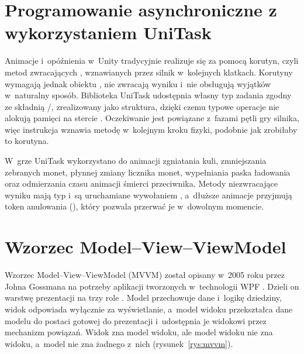 \section{Programowanie asynchroniczne z wykorzystaniem UniTask}

Animacje i~opóźnienia w~Unity tradycyjnie realizuje się za pomocą korutyn, czyli metod
zwracających , wznawianych przez silnik w~kolejnych klatkach. Korutyny
wymagają jednak obiektu , nie zwracają wyniku i~nie obsługują wyjątków
w~naturalny sposób. Biblioteka UniTask udostępnia własny typ zadania zgodny ze składnią
/, zrealizowany jako struktura, dzięki czemu typowe operacje nie
alokują pamięci na stercie \cite{unitask}. Oczekiwanie jest powiązane z~fazami pętli gry
silnika, więc instrukcja  wznawia metodę
w~kolejnym kroku fizyki, podobnie jak zrobiłaby to korutyna.

W~grze UniTask wykorzystano do animacji zgniatania kuli, zmniejszania zebranych monet,
płynnej zmiany licznika monet, wypełniania paska ładowania oraz odmierzania czasu animacji
śmierci przeciwnika. Metody niezwracające wyniku mają typ 
i~są uruchamiane wywołaniem , a~dłuższe animacje przyjmują token anulowania
(), który pozwala przerwać je w~dowolnym momencie.

\section{Wzorzec Model--View--ViewModel}

Wzorzec Model--View--ViewModel (MVVM) został opisany w~2005 roku przez Johna Gossmana
na potrzeby aplikacji tworzonych w~technologii WPF \cite{gossman}. Dzieli on warstwę
prezentacji na trzy role \cite{ms-mvvm}. Model przechowuje dane i~logikę dziedziny,
widok odpowiada wyłącznie za wyświetlanie, a~model widoku przekształca dane modelu do
postaci gotowej do prezentacji i~udostępnia je widokowi przez mechanizm powiązań. Widok
zna model widoku, ale model widoku nie zna widoku, a~model nie zna żadnego z~nich
(rysunek~\ref{rys:mvvm}).

